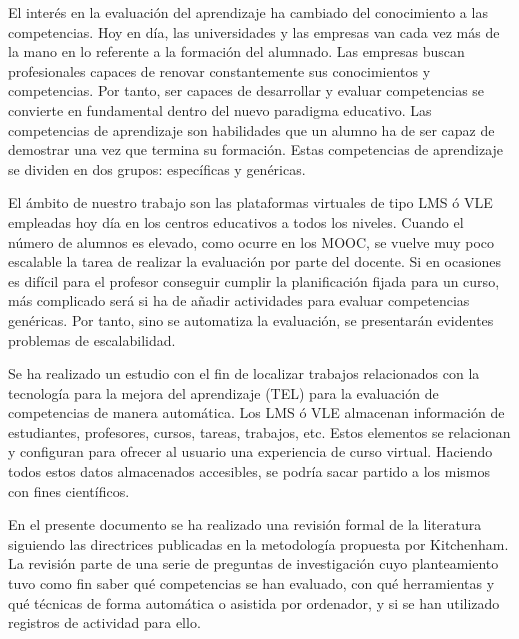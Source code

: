 


El interés en la evaluación del aprendizaje ha cambiado del conocimiento a las competencias. Hoy en día, las universidades y las empresas van cada vez más de la mano en lo referente a la formación del alumnado. Las empresas buscan profesionales capaces de renovar constantemente sus conocimientos y competencias. Por tanto, ser capaces de desarrollar y evaluar competencias se convierte en fundamental dentro del nuevo paradigma educativo. Las competencias de aprendizaje son habilidades que un alumno ha de ser capaz de demostrar una vez que termina su formación. Estas competencias de aprendizaje se dividen en dos grupos: específicas y genéricas.

El ámbito de nuestro trabajo son las plataformas virtuales de tipo LMS ó VLE empleadas hoy día en los centros educativos a todos los niveles. Cuando el número de alumnos es elevado, como ocurre en los MOOC, se vuelve muy poco escalable la tarea de realizar la evaluación por parte del docente. Si en ocasiones es difícil para el profesor conseguir cumplir la planificación fijada para un curso, más complicado será si ha de añadir actividades para evaluar competencias genéricas. Por tanto, sino se automatiza la evaluación, se presentarán evidentes problemas de escalabilidad.

Se ha realizado un estudio con el fin de localizar trabajos relacionados con la tecnología para la mejora del aprendizaje (TEL) para la evaluación de competencias de manera automática. Los LMS ó VLE almacenan información de estudiantes, profesores, cursos, tareas, trabajos, etc. Estos elementos se relacionan y configuran para ofrecer al usuario una experiencia de curso virtual. Haciendo todos estos datos almacenados accesibles, se podría sacar partido a los mismos con fines científicos.

En el presente documento se ha realizado una revisión formal de la literatura siguiendo las directrices publicadas en la metodología propuesta por Kitchenham. La revisión parte de una serie de preguntas de investigación cuyo planteamiento tuvo como fin saber qué competencias se han evaluado, con qué herramientas y qué técnicas de forma automática o asistida por ordenador, y si se han utilizado registros de actividad para ello.

